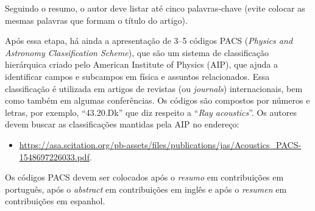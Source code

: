 \documentclass[12pt, a4paper, twoside, twocolumn]{article}
\begin{document}
Seguindo o resumo, o autor deve listar até cinco palavras-chave (evite colocar as mesmas palavras que formam o título do artigo).

Após essa etapa, há ainda a apresentação de 3--5 códigos PACS (\textit{Physics and Astronomy Classification Scheme}), que são um sistema de classificação hierárquica criado pelo American Institute of Physics (AIP), que ajuda a identificar campos e subcampos em física e assuntos relacionados. Essa classificação é utilizada em artigos de revistas (ou \textit{journals}) internacionais, bem como também em algumas conferências. Os códigos são compostos por números e letras, por exemplo, ``43.20.Dk'' que diz respeito a ``\textit{Ray acoustics}''. Os autores devem buscar as classificações mantidas pela AIP no endereço:

\begin{itemize}[noitemsep,topsep=-1ex] \itemsep=8pt
	\item \url{https://asa.scitation.org/pb-assets/files/publications/jas/Acoustics_PACS-1548697226033.pdf}\;.
\end{itemize}
\vspace{0.25em}

Os códigos PACS devem ser colocados após o \textit{resumo} em contribuições em português, após o \textit{abstract} em contribuições em inglês e após o \textit{resumen} em contribuições em espanhol.
\end{document}
